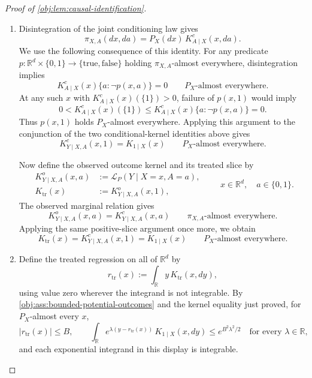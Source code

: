 \documentclass[11pt]{article}
\begin{document}
\begin{proof}[Proof of \cref{obj:lem:causal-identification}]
\begin{enumerate}
\item Disintegration of the joint conditioning law gives
\[
\pi_{X,A}(dx,da)=P_X(dx)\,K^c_{A\mid X}(x,da).
\]
We use the following consequence of this identity. For any predicate
\(p:\mathbb R^d\times\{0,1\}\to\{\text{true},\text{false}\}\) holding
\(\pi_{X,A}\)-almost everywhere, disintegration implies
\[
K^c_{A\mid X}(x)\{a:\neg p(x,a)\}=0
\qquad P_X\text{-almost everywhere}.
\]
At any such \(x\) with \(K^c_{A\mid X}(x)(\{1\})>0\), failure of \(p(x,1)\) would imply
\[
0<K^c_{A\mid X}(x)(\{1\})
\le K^c_{A\mid X}(x)\{a:\neg p(x,a)\}=0.
\]
Thus \(p(x,1)\) holds \(P_X\)-almost everywhere. Applying this argument to the conjunction of the two conditional-kernel identities above gives
\[
K^c_{Y\mid X,A}(x,1)=K_{1\mid X}(x)
\qquad P_X\text{-almost everywhere}.
\]

Now define the observed outcome kernel and its treated slice by
\[
\begin{aligned}
K^o_{Y\mid X,A}(x,a)&:=\mathcal L_P(Y\mid X=x,A=a),\\
K_{\mathrm{tr}}(x)&:=K^o_{Y\mid X,A}(x,1),
\end{aligned}
\qquad x\in\mathbb R^d,\quad a\in\{0,1\}.
\]
The observed marginal relation gives
\[
K^o_{Y\mid X,A}(x,a)=K^c_{Y\mid X,A}(x,a)
\qquad \pi_{X,A}\text{-almost everywhere}.
\]
Applying the same positive-slice argument once more, we obtain
\[
K_{\mathrm{tr}}(x)
=K^c_{Y\mid X,A}(x,1)
=K_{1\mid X}(x)
\qquad P_X\text{-almost everywhere}.
\]

\item Define the treated regression on all of \(\mathbb R^d\) by
\[
r_{\mathrm{tr}}(x):=\int_{\mathbb R}y\,K_{\mathrm{tr}}(x,dy),
\]
using value zero wherever the integrand is not integrable. By
\cref{obj:ass:bounded-potential-outcomes} and the kernel equality just proved, for \(P_X\)-almost every \(x\),
\[
|r_{\mathrm{tr}}(x)|\le B,
\qquad
\int_{\mathbb R}
e^{\lambda(y-r_{\mathrm{tr}}(x))}\,K_{1\mid X}(x,dy)
\le e^{B^2\lambda^2/2}
\quad\text{for every }\lambda\in\mathbb R,
\]
and each exponential integrand in this display is integrable.


\end{enumerate}
\end{proof}
\end{document}
